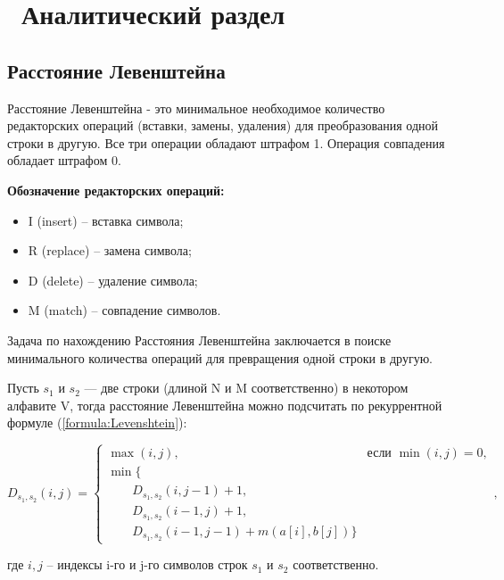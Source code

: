 \chapter{ Аналитический раздел}
\label{cha:analytical}
    \section{Расстояние Левенштейна}

	Расстояние Левенштейна - это минимальное необходимое количество редакторских операций (вставки, замены, удаления) для преобразования одной строки в другую. Все три операции обладают штрафом 1. Операция совпадения обладает штрафом 0.
	\par\textbf{Обозначение редакторских операций:} 
	\begin{itemize}
		\item I (insert) -- вставка символа;
		\item R (replace) -- замена символа;
		\item D (delete) -- удаление символа;
		\item M (match) -- совпадение символов.
	\end{itemize}
	
	Задача по нахождению Расстояния Левенштейна заключается в поиске минимального количества операций для превращения одной строки в другую.

    Пусть $s_{1}$ и $s_{2}$ — две строки (длиной N и M соответственно) в некотором алфавите V,
    тогда расстояние Левенштейна можно подсчитать по рекуррентной формуле (\ref{formula:Levenshtein}):

    \begin{equation}\label{formula:Levenshtein}
        	D_{s_1,s_2}(i, j) = \begin{cases}
        	\max(i, j), &\text{если }\min(i, j) = 0,\\
        	\min \lbrace \\
        	\qquad D_{s_1,s_2}(i, j-1) + 1,\\
        	\qquad D_{s_1,s_2}(i-1, j) + 1,\\
        	\qquad D_{s_1,s_2}(i-1, j-1) + m(a[i], b[j])
        		\rbrace
    \end{cases},
    \end{equation}\par где \begin{math}i,j\end{math} -- индексы i-го и j-го символов строк $s_{1}$ и $s_{2}$ соответственно.

